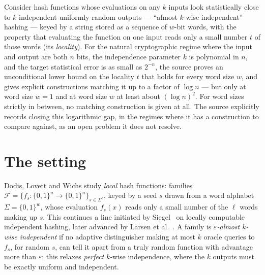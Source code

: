\documentclass{aicr-conjecture}
\newcommand{\eps}{\varepsilon}
\begin{document}

\vspace{0.4em}

\begin{informalconjecture}
Consider hash functions whose evaluations on any $k$ inputs look
statistically close to $k$ independent uniformly random outputs ---
``almost $k$-wise independent'' hashing --- keyed by a string stored as
a sequence of $w$-bit words, with the property that evaluating the
function on one input reads only a small number $t$ of those words
(its \emph{locality}). For the natural cryptographic regime where the
input and output are both $n$ bits, the independence parameter $k$ is
polynomial in $n$, and the target statistical error is as small as
$2^{-n}$, the source proves an unconditional lower bound on the
locality $t$ that holds for every word size $w$, and gives explicit
constructions matching it up to a factor of $\log n$ --- but only at
word size $w = 1$ and at word size $w$ at least about $(\log n)^{2}$.
For word sizes strictly in between, no matching construction is given
at all. The source explicitly records closing this logarithmic gap, in
the regimes where it has a construction to compare against, as an open
problem it does not resolve.
\end{informalconjecture}

\section{The setting}\label{sec:setting}

Dodis, Lovett and Wichs study \emph{local} hash functions: families
$\mathcal{F} = \{f_{s} : \{0,1\}^{n} \to \{0,1\}^{n}\}_{s \in
\Sigma^{\ell}}$, keyed by a seed $s$ drawn from a word alphabet
$\Sigma = \{0,1\}^{w}$, whose evaluation $f_{s}(x)$ reads only a small
number of the $\ell$ words making up $s$. This continues a line
initiated by Siegel~\cite{Sie89,Sie04} on locally computable
independent hashing, later advanced by Larsen et
al.~\cite{LPP+24}. A family is \emph{$\eps$-almost $k$-wise
independent} if no adaptive distinguisher making at most $k$ oracle
queries to $f_{s}$, for random $s$, can tell it apart from a truly
random function with advantage more than $\eps$; this relaxes
\emph{perfect} $k$-wise independence, where the $k$ outputs must be
exactly uniform and independent.
\end{document}
